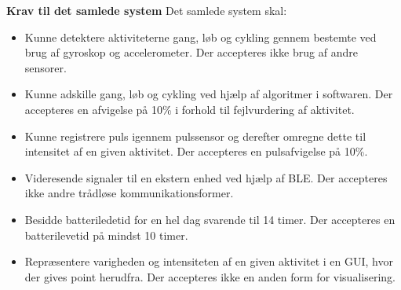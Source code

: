 \textbf{Krav til det samlede system} \newline
Det samlede system skal:
\begin{itemize}
	\item Kunne detektere aktiviteterne gang, løb og cykling gennem bestemte ved brug af gyroskop og accelerometer. Der accepteres ikke brug af andre sensorer.
	\item Kunne adskille gang, løb og cykling ved hjælp af algoritmer i softwaren. Der accepteres en afvigelse på 10\% i forhold til fejlvurdering af aktivitet.
	\item Kunne registrere puls igennem pulssensor og derefter omregne dette til intensitet af en given aktivitet. Der accepteres en pulsafvigelse på 10\%.
	\item Videresende signaler til en ekstern enhed ved hjælp af BLE. Der accepteres ikke andre trådløse kommunikationsformer.
	\item Besidde batteriledetid for en hel dag svarende til 14 timer. Der accepteres en batterilevetid på mindst 10 timer.
	\item Repræsentere varigheden og intensiteten af en given aktivitet i en GUI, hvor der gives point herudfra. Der accepteres ikke en anden form for visualisering. 
\end{itemize}


